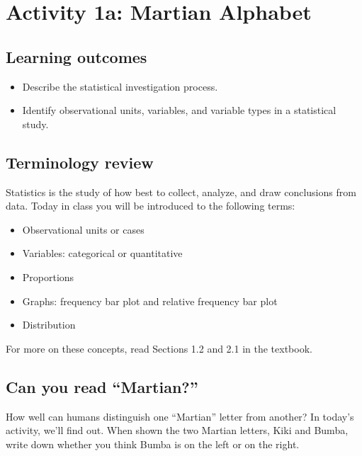 \documentclass[
]{report}
\begin{document}
\newpage

\hypertarget{activity-1a-martian-alphabet}{%
\section{Activity 1a: Martian Alphabet}\label{activity-1a-martian-alphabet}}


\hypertarget{learning-outcomes}{%
\subsection{Learning outcomes}\label{learning-outcomes}}

\begin{itemize}
\item
  Describe the statistical investigation process.
\item
  Identify observational units, variables, and variable types in a statistical study.
\end{itemize}

\hypertarget{terminology-review}{%
\subsection{Terminology review}\label{terminology-review}}

Statistics is the study of how best to collect, analyze, and draw conclusions from data. Today in class you will be introduced to the following terms:

\begin{itemize}
\item
  Observational units or cases
\item
  Variables: categorical or quantitative
\item
  Proportions
\item
  Graphs: frequency bar plot and relative frequency bar plot
\item
  Distribution
\end{itemize}

For more on these concepts, read Sections 1.2 and 2.1 in the textbook.

\hypertarget{can-you-read-martian}{%
\subsection{Can you read ``Martian?''}\label{can-you-read-martian}}

How well can humans distinguish one ``Martian'' letter from another? In today's activity, we'll find out. When shown the two Martian letters, Kiki and Bumba, write down whether you think Bumba is on the left or on the right.
\vspace{2mm}
\end{document}
